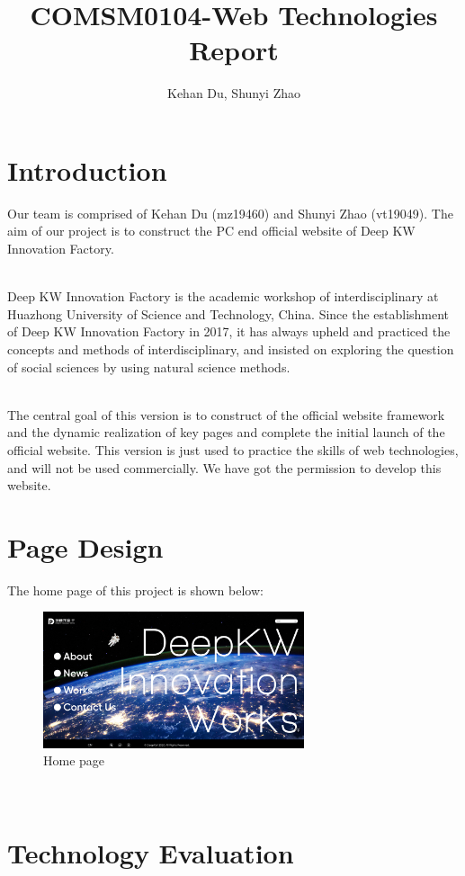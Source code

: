 \documentclass{article}
\title{COMSM0104-Web Technologies Report}
\author{Kehan Du, Shunyi Zhao}
\begin{document}
\maketitle

\section{Introduction}
Our team is comprised of Kehan Du (mz19460) and Shunyi Zhao (vt19049). The
aim of our project is to construct the PC end official website of Deep KW
Innovation Factory.

~\\
\noindent
Deep KW Innovation Factory is the academic workshop of interdisciplinary 
at Huazhong University of Science and Technology, China. Since the establishment 
of Deep KW Innovation Factory in 2017, it has always upheld and practiced 
the concepts and methods of interdisciplinary, and insisted on exploring 
the question of social sciences by using natural science methods.

~\\
\noindent
The central goal of this version is to construct of the official website 
framework and the dynamic realization of key pages and complete the initial 
launch of the official website. This version is just used to practice the skills
of web technologies, and will not be used commercially. We have got the
permission to develop this website.

\section{Page Design}
The home page of this project is shown below:
\\
\begin{figure}[h]
    \centering
    \includegraphics[height=4cm]{img/02.png}
    \caption{Home page}
    \label{fig: figure1}
\end{figure}
\\
\section{Technology Evaluation}
\end{document}
